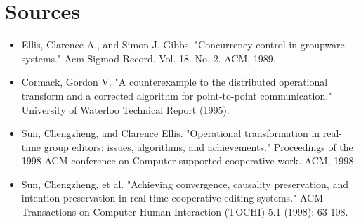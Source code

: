 \documentclass{article}
\begin{document}
\section{Sources}
\begin{itemize}
  \item Ellis, Clarence A., and Simon J. Gibbs. "Concurrency control in groupware systems." Acm Sigmod Record. Vol. 18. No. 2. ACM, 1989.
  \item Cormack, Gordon V. "A counterexample to the distributed operational transform and a corrected algorithm for point-to-point communication." University of Waterloo Technical Report (1995).
  \item Sun, Chengzheng, and Clarence Ellis. "Operational transformation in real-time group editors: issues, algorithms, and achievements." Proceedings of the 1998 ACM conference on Computer supported cooperative work. ACM, 1998.
  \item Sun, Chengzheng, et al. "Achieving convergence, causality preservation, and intention preservation in real-time cooperative editing systems." ACM Transactions on Computer-Human Interaction (TOCHI) 5.1 (1998): 63-108.
\end{itemize}
\end{document}
